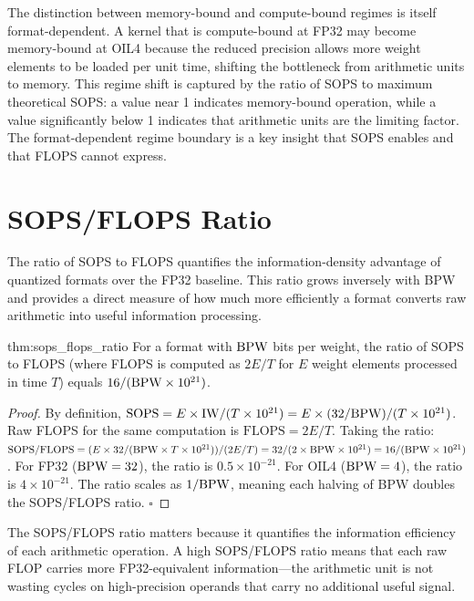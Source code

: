The distinction between memory-bound and compute-bound regimes is itself format-dependent. A kernel that is compute-bound at FP32 may become memory-bound at OIL4 because the reduced precision allows more weight elements to be loaded per unit time, shifting the bottleneck from arithmetic units to memory. This regime shift is captured by the ratio of SOPS to maximum theoretical SOPS: a value near 1 indicates memory-bound operation, while a value significantly below 1 indicates that arithmetic units are the limiting factor. The format-dependent regime boundary is a key insight that SOPS enables and that FLOPS cannot express.

\section{SOPS/FLOPS Ratio}
\label{sec:sops_flops_ratio}

The ratio of SOPS to FLOPS quantifies the information-density advantage of quantized formats over the FP32 baseline. This ratio grows inversely with BPW and provides a direct measure of how much more efficiently a format converts raw arithmetic into useful information processing.

\begin{mythm}{thm:sops_flops_ratio}
For a format with $\textnormal{BPW}$ bits per weight, the ratio of SOPS to FLOPS (where FLOPS is computed as $2E/T$ for $E$ weight elements processed in time $T$) equals $16 / (\textnormal{BPW} \times 10^{21})$.
\end{mythm}

\begin{proof}
By definition, $\text{SOPS} = E \times \mathrm{IW} / (T \times 10^{21}) = E \times (32/\textnormal{BPW}) / (T \times 10^{21})$. Raw FLOPS for the same computation is $\text{FLOPS} = 2E / T$. Taking the ratio: $\text{SOPS} / \text{FLOPS} = (E \times 32 / (\textnormal{BPW} \times T \times 10^{21})) / (2E / T) = 32 / (2 \times \textnormal{BPW} \times 10^{21}) = 16 / (\textnormal{BPW} \times 10^{21})$. For FP32 ($\textnormal{BPW} = 32$), the ratio is $0.5 \times 10^{-21}$. For OIL4 ($\textnormal{BPW} = 4$), the ratio is $4 \times 10^{-21}$. The ratio scales as $1/\textnormal{BPW}$, meaning each halving of BPW doubles the SOPS/FLOPS ratio. $\square$
\end{proof}

The SOPS/FLOPS ratio matters because it quantifies the information efficiency of each arithmetic operation. A high SOPS/FLOPS ratio means that each raw FLOP carries more FP32-equivalent information---the arithmetic unit is not wasting cycles on high-precision operands that carry no additional useful signal.

